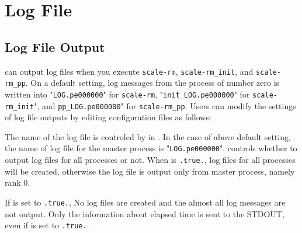 \section{Log File} \label{sec:log}


\subsection{Log File Output}

\scalerm can output log files when you execute \verb|scale-rm|, \verb|scale-rm_init|, and \verb|scale-rm_pp|.
On a default setting, log messages from the process of number zero is written into "\verb|LOG.pe000000|" for \verb|scale-rm|, "\verb|init_LOG.pe000000|" for \verb|scale-rm_init|", and \verb|pp_LOG.pe000000|" for \verb|scale-rm_pp|.
Users can modify the settings of log file outputs by editing configuration files as follows:


The name of the log file is controled by  in .
In the case of above default setting, the name of log file for the master process is "\verb|LOG.pe000000|".
 controls whether to output log files for all processes or not.
When  is \verb|.true.|, log files for all processes will be created, otherwise the log file is output only from master process, namely rank 0.

If  is set to \verb|.true.|, No log files are created and the almost all log messages are not output.
Only the information about elapsed time is sent to the STDOUT, even if  is set to \verb|.true.|.


